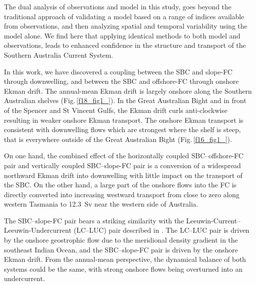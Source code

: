 \documentclass[preprint,3p,review,12pt]{elsarticle}
\begin{document}
The dual analysis of observations and model in this study, goes beyond the traditional approach of validating a model based on a range of indices available from observations, and then analyzing spatial and temporal variability using the model alone. We find here that applying identical methods to both model and observations, leads to enhanced confidence in the structure and transport of the Southern Australia Current System.

In this work, we have discovered a coupling between the SBC and slope-FC through downwelling, and between the SBC and offshore-FC through onshore Ekman drift. The annual-mean Ekman drift is largely onshore along the Southern Australian shelves (Fig.\,\ref{f18_fig1_}). In the Great Australian Bight and in front of the Spencer and St Vincent Gulfs, the Ekman drift curls anti-clockwise resulting in weaker onshore Ekman transport. The onshore Ekman transport is consistent with downwelling flows which are strongest where the shelf is steep, that is everywhere outside of the Great Australian Bight (Fig.\,\ref{f16_fig1_}).

On one hand, the combined effect of the horizontally coupled SBC--offshore-FC pair and vertically coupled SBC--slope-FC pair is a conversion of a widespread northward Ekman drift into downwelling with little impact on the transport of the SBC\@. On the other hand, a large part of the onshore flows into the FC is directly converted into increasing westward transport from close to zero along western Tasmania to \SI{12.3}{Sv} near the western side of Australia. 

The SBC--slope-FC pair bears a striking similarity with the Leeuwin-Current--Leeuwin-Undercurrent (LC--LUC) pair described in \citet{Furue2017}. The LC--LUC pair is driven by the onshore geostrophic flow due to the meridional density gradient in the southeast Indian Ocean, and the SBC--slope-FC pair is driven by the onshore Ekman drift. From the annual-mean perspective, the dynamical balance of both systems could be the same, with strong onshore flows being overturned into an undercurrent.
\end{document}
